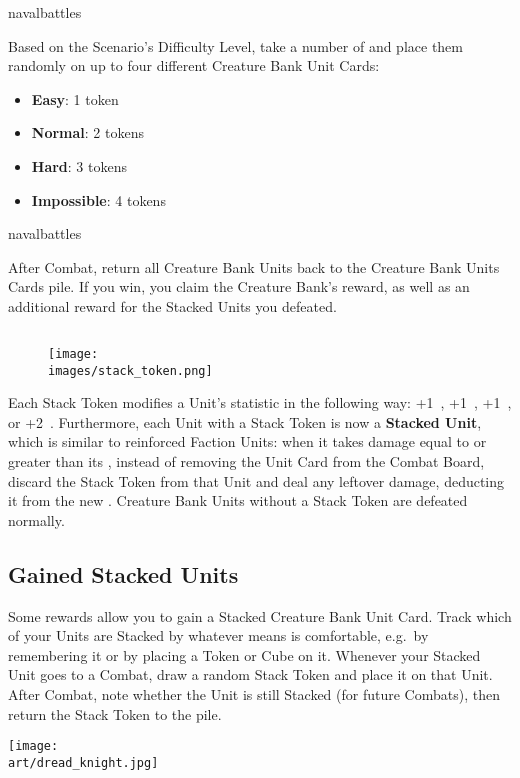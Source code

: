 \begin{expansion}[before=\vspace*{-11mm}]{navalbattles}
\begin{multicols*}{2}
  Based on the Scenario's Difficulty Level, take a number of  and place them randomly on up to four different Creature Bank Unit Cards:
  \begin{itemize}
    \item \textbf{Easy}: 1 token
    \item \textbf{Normal}: 2 tokens
    \item \textbf{Hard}: 3 tokens
    \item \textbf{Impossible}: 4 tokens
  \end{itemize}
  \end{multicols*}
\end{expansion}
\begin{expansion}[before=\vspace*{-11mm}]{navalbattles}
  \begin{multicols*}{2}
  After Combat, return all Creature Bank Units back to the Creature Bank Units Cards pile.
  If you win, you claim the Creature Bank's reward, as well as an additional reward for the Stacked Units you defeated.
  \subsection*{}
    \setlength\intextsep{0pt}
    \setlength\columnsep{1em}
    \begin{wrapfigure}{r}{0.2\linewidth}
      \texttt{[image: \\images/stack\_token.png]}
    \end{wrapfigure}
  Each Stack Token modifies a Unit's statistic in the following way: +1~, +1~, +1~, or +2~.
  Furthermore, each Unit with a Stack Token is now a \textbf{Stacked Unit}, which is similar to reinforced Faction Units: when it takes damage equal to or greater than its , instead of removing the Unit Card from the Combat Board, discard the Stack Token from that Unit and deal any leftover damage, deducting it from the new .
  Creature Bank Units without a Stack Token are defeated normally.
  \columnbreak

  \subsection*{Gained Stacked Units}
  Some rewards allow you to gain a Stacked Creature Bank Unit Card.
  Track which of your Units are Stacked by whatever means is comfortable, e.g.~by remembering it or by placing a Token or Cube on it.
  Whenever your Stacked Unit goes to a Combat, draw a random Stack Token and place it on that Unit.
  After Combat, note whether the Unit is still Stacked (for future Combats), then return the Stack Token to the pile.
\end{multicols*}
\end{expansion}
\vfill
\hspace*{-1.2em}\texttt{[image: \\art/dread\_knight.jpg]}

